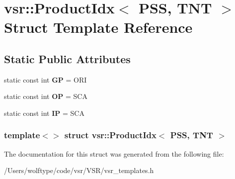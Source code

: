 \hypertarget{structvsr_1_1_product_idx_3_01_p_s_s_00_01_t_n_t_01_4}{\section{vsr\-:\-:Product\-Idx$<$ P\-S\-S, T\-N\-T $>$ Struct Template Reference}
\label{structvsr_1_1_product_idx_3_01_p_s_s_00_01_t_n_t_01_4}
}
\subsection*{Static Public Attributes}
\begin{DoxyCompactItemize}
\item 
\hypertarget{structvsr_1_1_product_idx_3_01_p_s_s_00_01_t_n_t_01_4_a398787d0da81c5be02a23c05434f2ce8}{static const int {\bfseries G\-P} = O\-R\-I}\label{structvsr_1_1_product_idx_3_01_p_s_s_00_01_t_n_t_01_4_a398787d0da81c5be02a23c05434f2ce8}

\item 
\hypertarget{structvsr_1_1_product_idx_3_01_p_s_s_00_01_t_n_t_01_4_ae3436c4a4c1e85cb52f8cd6ec9894fc9}{static const int {\bfseries O\-P} = S\-C\-A}\label{structvsr_1_1_product_idx_3_01_p_s_s_00_01_t_n_t_01_4_ae3436c4a4c1e85cb52f8cd6ec9894fc9}

\item 
\hypertarget{structvsr_1_1_product_idx_3_01_p_s_s_00_01_t_n_t_01_4_a9c95094d1caa47865f951c91ed13a8a0}{static const int {\bfseries I\-P} = S\-C\-A}\label{structvsr_1_1_product_idx_3_01_p_s_s_00_01_t_n_t_01_4_a9c95094d1caa47865f951c91ed13a8a0}

\end{DoxyCompactItemize}
\subsubsection*{template$<$$>$ struct vsr\-::\-Product\-Idx$<$ P\-S\-S, T\-N\-T $>$}



The documentation for this struct was generated from the following file\-:\begin{DoxyCompactItemize}
\item 
/\-Users/wolftype/code/vsr/\-V\-S\-R/vsr\-\_\-templates.\-h\end{DoxyCompactItemize}
